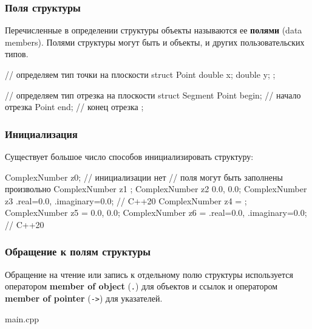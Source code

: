 \documentclass[compress, 8pt, aspectratio=169]{beamer}
\begin{document}
\begin{frame}[fragile]

    \frametitle{Поля структуры}

    Перечисленные в определении структуры объекты называются ее
    \textbf{полями}\footnotemark{} (data members).
    Полями структуры могут быть и объекты, и других пользовательских типов.


    \begin{myinplacelisting}[minted language=cpp]
// определяем тип точки на плоскости
struct Point {
    double x;
    double y;
};

// определяем тип отрезка на плоскости
struct Segment {
    Point begin;    // начало отрезка
    Point end;      // конец отрезка
};
    \end{myinplacelisting}

\end{frame}

\begin{frame}[fragile]

    \frametitle{Инициализация}

    Существует большое число способов инициализировать структуру:

    \begin{myinplacelisting}[minted language=cpp]
ComplexNumber z0;   // инициализации нет
                    // поля могут быть заполнены произвольно
ComplexNumber z1 {};
ComplexNumber z2 {0.0, 0.0};
ComplexNumber z3 {.real=0.0, .imaginary=0.0}; // C++20
ComplexNumber z4 = {};
ComplexNumber z5 = {0.0, 0.0};
ComplexNumber z6 = {.real=0.0, .imaginary=0.0}; // C++20
    \end{myinplacelisting}

\end{frame}

\begin{frame}[fragile]

    \frametitle{Обращение к полям структуры}

    \hfill\break
    Обращение на чтение или запись к отдельному полю структуры используется оператором
    \textbf{member of object} (\verb|.|) для объектов и ссылок и оператором
    \textbf{member of pointer} (\verb|->|) для указателей\footnotemark{}.


        {main.cpp}

\end{frame}
\end{document}
